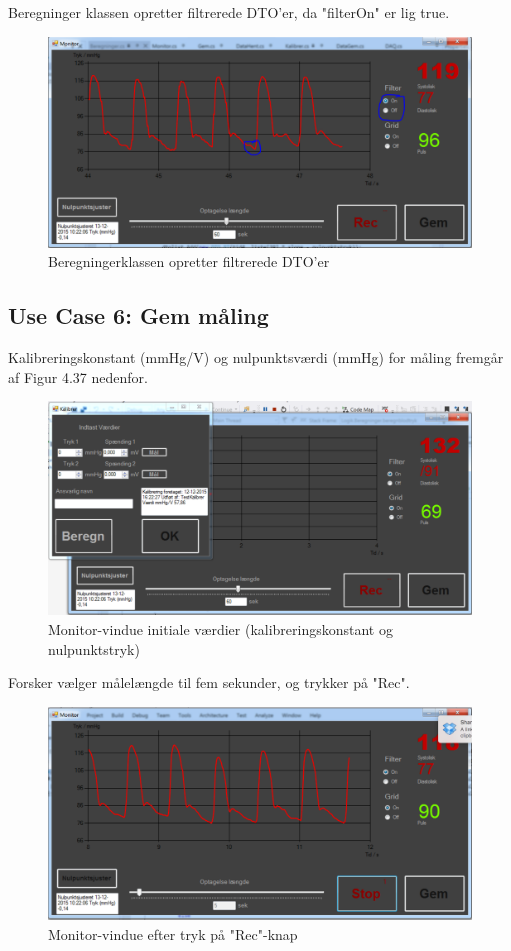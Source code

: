 Beregninger klassen opretter filtrerede DTO'er, da "filterOn" er lig true.

\begin{figure}[H]
	\centering
	\includegraphics[width=1\textwidth]{Figurer/Test_Aktiver_3}
	\caption{Beregningerklassen opretter filtrerede DTO'er}
\end{figure}

\subsection{Use Case 6: Gem måling}
Kalibreringskonstant (mmHg/V) og nulpunktsværdi (mmHg) for måling fremgår af Figur 4.37 nedenfor.
\begin{figure}[H]
	\centering
	\includegraphics[width=1\textwidth]{Figurer/UC6_InitialConditions}
	\caption{Monitor-vindue initiale værdier (kalibreringskonstant og nulpunktstryk)}
\end{figure}
 
 Forsker vælger målelængde til fem sekunder, og trykker på "Rec".
 
\begin{figure}[H]
	\centering
	\includegraphics[width=1\textwidth]{Figurer/UC6_ForceRecEnd}
	\caption{Monitor-vindue efter tryk på "Rec"\--knap}
\end{figure}

